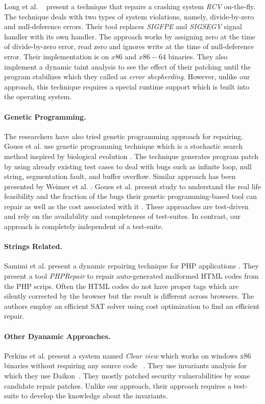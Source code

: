 Long et al. ~\cite{conf/pldi/LongSR14}
present a technique that repairs a crashing system \emph{RCV} on-the-fly.
The technique deals with two types of system violations, namely, divide-by-zero and
null-deference errors. Their tool replaces \emph{SIGFPE} and \emph{SIGSEGV}
signal handler with its own handler. The approach works by assigning zero
at the time of divide-by-zero error, read zero and ignores write at the time of
null-deference error. Their implementation is on $x86$ and $x86-64$ binaries.
They also implement a dynamic taint analysis to see the effect of their
patching until the program stabilizes which they called as \emph{error
shepherding}. However, unlike our approach, this technique requires a special runtime support which is 
built into the operating system.

\paragraph{Genetic Programming.}
The researchers have also tried genetic programming approach for repairing.
Goues et al. use genetic programming technique which is a stochastic search
method inspired by biological evolution \cite{GouesNFW12}. The technique generates program patch
by using already existing test cases to deal with bugs such as infinite loop, null
string, segmentation fault, and buffer overflow. Similar approach has been presented by 
Weimer et al. \cite{WeimerFGN10}. Goues et al. present study to understand the real life feasibility and
the fraction of the bugs their genetic programming-based tool can repair as well as the cost associated
with it \cite{GouesDFW12}. These approaches are test-driven and rely on the availability and completeness of test-suites.
In contrast, our approach is completely independent of a test-suite.

\paragraph{Strings Related.}
Samimi et al. present a dynamic repairing technique for PHP applications  \cite{SamirniSAMTH12}.
They present a tool \textit{PHPRepair} to repair auto-generated
malformed HTML codes from the PHP scrips. Often the HTML codes do not have
proper tags which are silently corrected by the browser but the result is
different across browsers. The authors employ an efficient SAT solver
using cost optimization to find an efficient repair.

\paragraph{Other Dyanamic Approaches.}
Perkins et al. present a system named \emph{Clear view} which works on windows x86 binaries
without requiring any source code ~\cite{conf/sosp/PerkinsKLABCPSSSWZER09}.
They use invariants analysis for which they
use Daikon~\cite{DBLP:journals/scp/ErnstPGMPTX07}. They mostly patched security
vulnerabilities by some candidate repair patches. Unlike our approach, their approach requires a test-suite
to develop the knowledge about the invariants.

